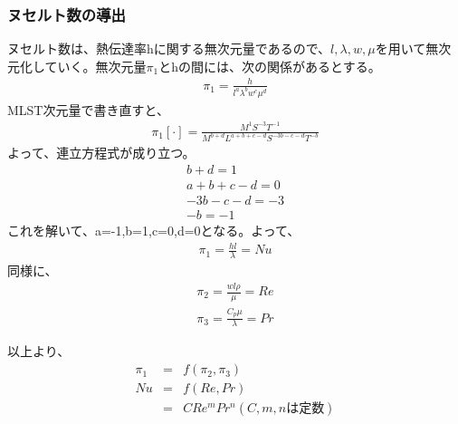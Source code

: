 \documentclass[a4j,twoside,openright,11pt]{jarticle}
\begin{document}
\subsubsection{ヌセルト数の導出}
ヌセルト数は、熱伝達率hに関する無次元量であるので、$l,\lambda,w,\mu$を用いて無次元化していく。無次元量$\pi_1$とhの間には、次の関係があるとする。
\begin{eqnarray}
\pi_1 = \frac{h}{l^a \lambda^b w^c \mu^d}
\end{eqnarray}
MLST次元量で書き直すと、
\begin{eqnarray}
\pi_1[\cdot] = \frac{M^1S^{-3}T^{-1}}{M^{b+d} L^{a+b+c-d} S^{-3b-c-d} T^{-b}}
\end{eqnarray}
よって、連立方程式が成り立つ。
\begin{eqnarray}
b+d = 1\nonumber\\
a+b+c-d = 0\nonumber\\
-3b-c-d = -3\nonumber\\
-b = -1\nonumber
\end{eqnarray}
これを解いて、a=-1,b=1,c=0,d=0となる。よって、
\begin{eqnarray}
\pi_1 = \frac{hl}{\lambda}= Nu
\end{eqnarray}
同様に、
\begin{eqnarray}
\pi_2 = \frac{wl\rho}{\mu}= Re\\
\pi_3 = \frac{C_p\mu}{\lambda}= Pr
\end{eqnarray}

以上より、
\begin{eqnarray}
\pi_1 &=& f(\pi_2,\pi_3)\nonumber\\
Nu    &=& f(Re,Pr)\nonumber\\
      &=& CRe^mPr^n (C,m,nは定数)
\end{eqnarray}
\end{document}
